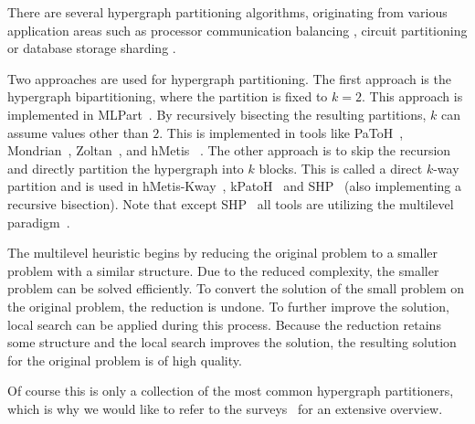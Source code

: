 \documentclass[a4paper,12pt,titlepage, BCOR7mm,headsepline]{scrbook}
\numberwithin{equation}{section}
\begin{document}

There are several hypergraph partitioning algorithms, originating from various application areas such as processor communication balancing \cite{catalyurek1999hypergraph}, circuit partitioning \cite{alpert1998multilevel} or database storage sharding \cite{kabiljo2017social}.

Two approaches are used for hypergraph partitioning. The first approach is the hypergraph bipartitioning, where the partition is fixed to $k=2$. This approach is implemented in MLPart~\cite{alpert1998multilevel}. By recursively bisecting the resulting partitions, $k$ can assume values other than $2$. This is implemented in tools like PaToH~\cite{catalyurek1999hypergraph}, Mondrian~\cite{vastenhouw2005two}, Zoltan~\cite{devine2006parallel}, and hMetis~\cite{karypis1999multilevel}%
. The other approach is to skip the recursion and directly partition the hypergraph into $k$ blocks. This is called a direct $k$-way partition and is used in hMetis-Kway~\cite{karypis2000multilevel}, kPatoH~\cite{aykanat2008multi} and SHP~\cite{kabiljo2017social} (also implementing a recursive bisection). Note that except SHP~\cite{kabiljo2017social} all tools are utilizing the multilevel paradigm~\cite{bulucc2016recent}. 

The multilevel heuristic \cite{bulucc2016recent} begins by reducing the original problem to a smaller problem with a similar structure. Due to the reduced complexity, the smaller problem can be solved efficiently. To convert the solution of the small problem on the original problem, the reduction is undone. To further improve the solution, local search can be applied during this process. Because the reduction retains some structure and the local search improves the solution, the resulting solution for the original problem is of high quality.

Of course this is only a collection of the most common hypergraph partitioners, which is why we would like to refer to the %
surveys~\cite{alpert1995recent,bader2013graph,papa2007hypergraph,trifunovic2006parallel} for an extensive overview.
\end{document}
